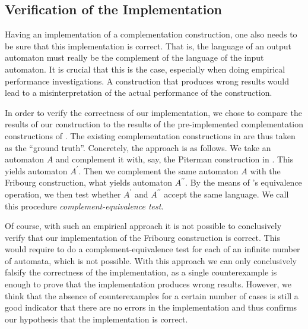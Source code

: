 
\subsection{Verification of the Implementation}
Having an implementation of a complementation construction, one also needs to be sure that this implementation is correct. That is, the language of an output automaton must really be the complement of the language of the input automaton. It is crucial that this is the case, especially when doing empirical performance investigations. A construction that produces wrong results would lead to a misinterpretation of the actual performance of the construction.

In order to verify the correctness of our implementation, we chose to compare the results of our construction to the results of the pre-implemented complementation constructions of \goal. The existing complementation constructions in \goal{} are thus taken as the ``ground truth''. Concretely, the approach is as follows. We take an automaton $A$ and complement it with, say, the Piterman construction in \goal{}. This yields automaton $A^\prime$. Then we complement the same automaton $A$ with the Fribourg construction, what yields automaton $A^{\prime\prime}$. By the means of \goal's equivalence operation, we then test whether $A^\prime$ and $A^{\prime\prime}$ accept the same language. We call this procedure \textit{complement-equivalence test}.

Of course, with such an empirical approach it is not possible to conclusively verify that our implementation of the Fribourg construction is correct. This would require to do a complement-equivalence test for each of an infinite number of automata, which is not possible. With this approach we can only conclusively falsify the correctness of the implementation, as a single counterexample is enough to prove that the implementation produces wrong results. However, we think that the absence of counterexamples for a certain number of cases is still a good indicator that there are no errors in the implementation and thus confirms our hypothesis that the implementation is correct.

